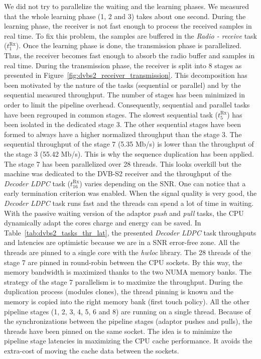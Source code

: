 We did not try to parallelize the waiting and the learning phases. We measured
that the whole learning phase (1, 2 and 3) takes about one second. During the
learning phase, the receiver is not fast enough to process the received samples
in real time. To fix this problem, the samples are buffered in the \emph{Radio -
receive} task ($t^\text{Rx}_{1}$). Once the learning phase is done, the
transmission phase is parallelized. Thus, the receiver becomes fast enough to
absorb the radio buffer and samples in real time. During the transmission phase,
the receiver is split into 8 stages as presented in
Figure~\ref{fig:dvbs2_receiver_transmission}. This decomposition has been
motivated by the nature of the tasks (sequential or parallel) and by the
sequential measured throughput. The number of stages has been minimized in order
to limit the pipeline overhead. Consequently, sequential and parallel tasks
have been regrouped in common stages. The slowest sequential task
($t^\text{Rx}_{5}$) has been isolated in the dedicated stage 3. The other
sequential stages have been formed to always have a higher normalized throughput
than the stage 3. The sequential throughput of the stage 7 (5.35 Mb/s) is lower
than the throughput of the stage 3 (55.42 Mb/s). This is why the sequence
duplication has been applied. The stage 7 has been parallelized over 28 threads.
This looks overkill but the machine was dedicated to the DVB-S2 receiver
and the throughput of the \emph{Decoder LDPC} task ($t^\text{Rx}_{16}$) varies
depending on the SNR. One can notice that a early termination criterion was
enabled. When the signal quality is very good, the \emph{Decoder LDPC} task runs
fast and the threads can spend a lot of time in waiting. With the passive
waiting version of the adaptor \emph{push} and \emph{pull} tasks, the CPU
dynamically adapt the cores charge and energy can be saved. In
Table~\ref{tab:dvbs2_tasks_thr_lat}, the presented \emph{Decoder LDPC} task
throughputs and latencies are optimistic because we are in a SNR error-free
zone. All the threads are pinned to a single core with the \emph{hwloc} library.
The 28 threads of the stage 7 are pinned in round-robin between the CPU sockets.
By this way, the memory bandwidth is maximized thanks to the two NUMA memory
banks. The strategy of the stage 7 parallelism is to maximize the throughput.
During the duplication process (modules clones), the thread pinning is known and
the memory is copied into the right memory bank (first touch policy). All the
other pipeline stages (1, 2, 3, 4, 5, 6 and 8) are running on a single thread.
Because of the synchronizations between the pipeline stages (adaptor pushes and
pulls), the threads have been pinned on the same socket. The idea is to minimize
the pipeline stage latencies in maximizing the CPU cache performance. It avoids
the extra-cost of moving the cache data between the sockets.

